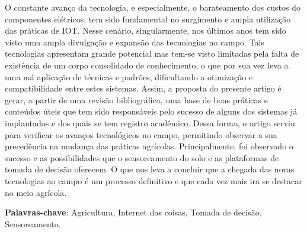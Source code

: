 \documentclass[
article,			%
12pt,				%
oneside,			%
a4paper,			%
english,			%
brazil,				%
sumario=tradicional
]{abntex2}
\begin{document}

\frenchspacing 


%
%

\maketitle



\begin{resumoumacoluna}
  O constante avanço da tecnologia, e especialmente, o barateamento dos custos do componentes elétricos, tem sido fundamental no surgimento e ampla utilização das práticas de IOT. Nesse cenário, singularmente, nos últimos anos tem sido visto uma ampla divulgação e expansão das tecnologias no campo. Tais tecnologias apresentam grande potencial mas tem-se visto limitadas pela falta de existência de um corpo consolidado de conhecimento, o que por sua vez leva a uma má aplicação de técnicas e padrões, dificultando a otimização e compatibilidade entre estes sistemas. Assim, a proposta do presente artigo é gerar, a partir de uma revisão bibliográfica, uma base de boas práticas e conteúdos úteis que tem sido responsáveis pelo sucesso de alguns dos sistemas já implantados e dos quais se tem registro acadêmico. Dessa forma, o artigo serviu para verificar os avanços tecnológicos no campo, permitindo observar a sua precedência na mudança das práticas agrícolas. Principalmente, foi observado o sucesso e as possibilidades que o sensoreamento do solo e as plataformas de tomada de decisão oferecem. O que nos leva a concluir que a chegada das novas tecnologias ao campo é um processo definitivo e que cada vez mais ira se destacar no meio agrícola.

  \textbf{Palavras-chave}: Agricultura, Internet das coisas, Tomada de decisão, Sensoreamento.

  \vspace{\onelineskip}

  \noindent
\end{resumoumacoluna}
\end{document}
